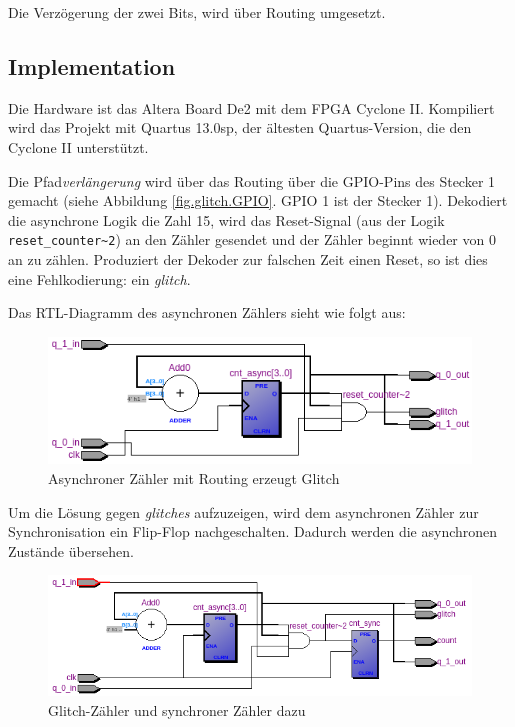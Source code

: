 Die Verzögerung der zwei Bits, wird über Routing umgesetzt. 

\subsection{Implementation} 

Die Hardware ist das Altera Board De2 mit dem FPGA Cyclone II. Kompiliert wird das Projekt mit Quartus 13.0sp, der ältesten Quartus-Version, die den Cyclone II unterstützt.

Die Pfad\textit{verlängerung} wird über das Routing über die GPIO-Pins des Stecker 1 gemacht (siehe Abbildung \ref{fig.glitch.GPIO}. GPIO 1 ist der Stecker 1). Dekodiert die asynchrone Logik die Zahl 15, wird das  Reset-Signal (aus der Logik \lstinline|reset_counter~2|) an den Zähler gesendet und der Zähler beginnt wieder von 0 an zu zählen. Produziert der Dekoder zur falschen Zeit einen Reset, so ist dies eine Fehlkodierung: ein \textit{glitch}.

Das RTL-Diagramm des asynchronen Zählers sieht wie folgt aus:
\begin{figure}[H]
	\includegraphics[width=1\textwidth]{images/glitch/RTL_asynchron.png}
	\caption{Asynchroner Zähler mit Routing erzeugt Glitch}
	\label{fig.glitch.RTL_nurGlitch}
\end{figure}

Um die Lösung gegen \textit{glitches} aufzuzeigen, wird dem asynchronen Zähler zur Synchronisation ein Flip-Flop nachgeschalten. Dadurch werden die asynchronen Zustände übersehen. 
\begin{figure}[H]
	\includegraphics[width=\textwidth]{images/glitch/glitch_asynch_new.png}
	\caption{Glitch-Zähler und synchroner Zähler dazu}
	\label{fig.glitch.RTL_mit_synchr.Zaehler}
\end{figure}

